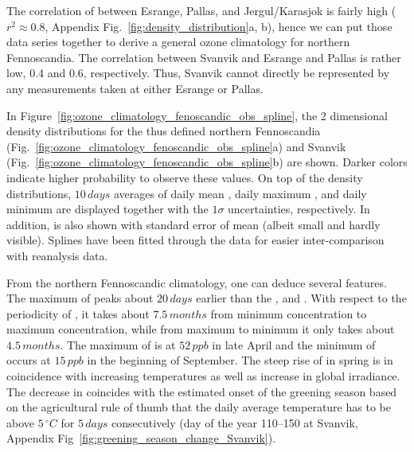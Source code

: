 \documentclass[bg, manuscript]{copernicus}
\begin{document}
The correlation of \chem{[O_3]} between Esrange, Pallas, and Jergul/Karasjok is fairly high ($r^2\approx 0.8$, Appendix Fig.~\ref{fig:density_distribution}a, b), hence we can put those data series together to derive a general ozone climatology for northern Fennoscandia. The correlation between Svanvik and Esrange and Pallas is rather low, 0.4 and 0.6, respectively. Thus, Svanvik cannot directly be represented by any measurements taken at either Esrange or Pallas.

In Figure~\ref{fig:ozone_climatology_fenoscandic_obs_spline}, the 2 dimensional density distributions for the thus defined northern Fennoscandia (Fig.~\ref{fig:ozone_climatology_fenoscandic_obs_spline}a) and Svanvik (Fig.~\ref{fig:ozone_climatology_fenoscandic_obs_spline}b) are shown. Darker colors indicate higher probability to observe these values. On top of the density distributions, $10\,\unit{days}$ averages of daily mean , daily maximum , and daily minimum  are displayed together with the $1 \sigma$ uncertainties, respectively. In addition,  is also shown with standard error of mean (albeit small and hardly visible). Splines have been fitted through the data for easier inter-comparison with reanalysis data.

From the northern Fennoscandic climatology, one can deduce several features. The maximum of  peaks about $20\,\unit{days}$ earlier than the , and . With respect to the periodicity of , it takes about $7.5\,\unit{months}$ from minimum concentration to maximum concentration, while from maximum to minimum it only takes about $4.5\,\unit{months}$. The maximum of  is at $52\,\unit{ppb}$ in late April and the minimum of  occurs at $15\,\unit{ppb}$ in the beginning of September. The steep rise of  in spring is in coincidence with increasing temperatures as well as increase in global irradiance. The decrease in  coincides with the estimated onset of the greening season based on the agricultural rule of thumb that the daily average temperature has to be above $5\,\unit{^\circ C}$ for $5\,\unit{days}$ consecutively (day of the year 110--150 at Svanvik, Appendix Fig~\ref{fig:greening_season_change_Svanvik}).
\end{document}
